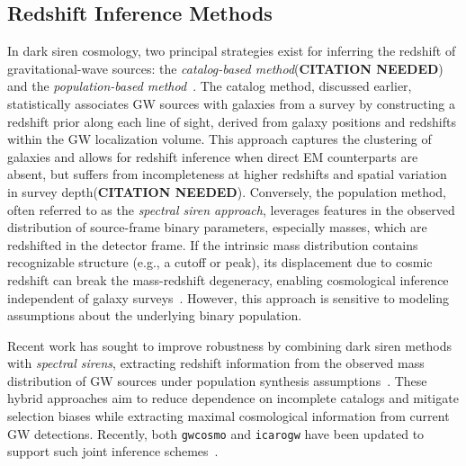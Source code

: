 \subsection{Redshift Inference Methods}
In dark siren cosmology, two principal strategies exist for inferring the redshift of gravitational-wave sources: the \textit{catalog-based method}(\textbf{CITATION NEEDED}) and the \textit{population-based method}~\citep{ezquiaga2022spectral}. The catalog method, discussed earlier, statistically associates GW sources with galaxies from a survey by constructing a redshift prior along each line of sight, derived from galaxy positions and redshifts within the GW localization volume. This approach captures the clustering of galaxies and allows for redshift inference when direct \ac{EM} counterparts are absent, but suffers from incompleteness at higher redshifts and spatial variation in survey depth(\textbf{CITATION NEEDED}). Conversely, the population method, often referred to as the \textit{spectral siren approach}, leverages features in the observed distribution of source-frame binary parameters, especially masses, which are redshifted in the detector frame. If the intrinsic mass distribution contains recognizable structure (e.g., a cutoff or peak), its displacement due to cosmic redshift can break the mass-redshift degeneracy, enabling cosmological inference independent of galaxy surveys~\citep{ezquiaga2022spectral}. However, this approach is sensitive to modeling assumptions about the underlying binary population. 

Recent work has sought to improve robustness by combining dark siren methods with \textit{spectral sirens}, extracting redshift information from the observed mass distribution of \ac{GW} sources under population synthesis assumptions~\citep{ezquiaga2022spectral}. These hybrid approaches aim to reduce dependence on incomplete catalogs and mitigate selection biases while extracting maximal cosmological information from current GW detections. Recently, both \texttt{gwcosmo} and \texttt{icarogw} have been updated to support such joint inference schemes~\citep{gray2023joint, mastrogiovanni2024icarogw}.


